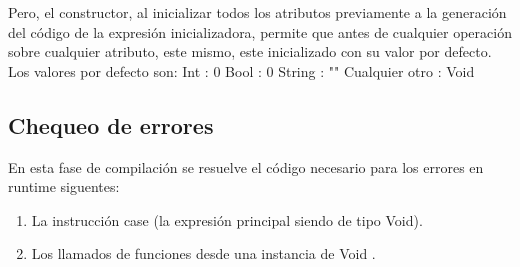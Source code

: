 \documentclass[]{article}
\begin{document}
Pero, el constructor, al inicializar todos los atributos previamente a la generaci\'on del c\'odigo de la expresi\'on inicializadora, permite que antes de cualquier operaci\'on sobre cualquier atributo, este mismo, este inicializado con su valor por defecto. Los valores por defecto son:
Int : 0
Bool : 0
String : ""
Cualquier otro : Void

\subsection{Chequeo de errores}
En esta fase de compilaci\'on se resuelve el c\'odigo necesario para los errores en runtime siguentes:
\begin{enumerate}
	\item La instrucci\'on case (la expresi\'on principal siendo de tipo Void).
	\item Los llamados de funciones desde una instancia de Void .
\end{enumerate}
\end{document}

